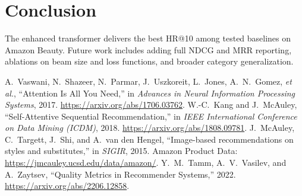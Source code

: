 \documentclass[11pt]{article}
\begin{document}
\section{Conclusion}
The enhanced transformer delivers the best HR@10 among tested baselines on Amazon Beauty. Future work includes adding full NDCG and MRR reporting, ablations on beam size and loss functions, and broader category generalization.

\begin{thebibliography}{9}
 A.~Vaswani, N.~Shazeer, N.~Parmar, J.~Uszkoreit, L.~Jones, A.~N.~Gomez, \emph{et al.}, ``Attention Is All You Need,'' in \emph{Advances in Neural Information Processing Systems}, 2017. \url{https://arxiv.org/abs/1706.03762}.
 W.-C.~Kang and J.~McAuley, ``Self-Attentive Sequential Recommendation,'' in \emph{IEEE International Conference on Data Mining (ICDM)}, 2018. \url{https://arxiv.org/abs/1808.09781}.
 J.~McAuley, C.~Targett, J.~Shi, and A.~van den Hengel, ``Image-based recommendations on styles and substitutes,'' in \emph{SIGIR}, 2015. Amazon Product Data: \url{https://jmcauley.ucsd.edu/data/amazon/}.
 Y.~M.~Tamm, A.~V.~Vasilev, and A.~Zaytsev, ``Quality Metrics in Recommender Systems,'' 2022. \url{https://arxiv.org/abs/2206.12858}.
\end{thebibliography}
\end{document}

